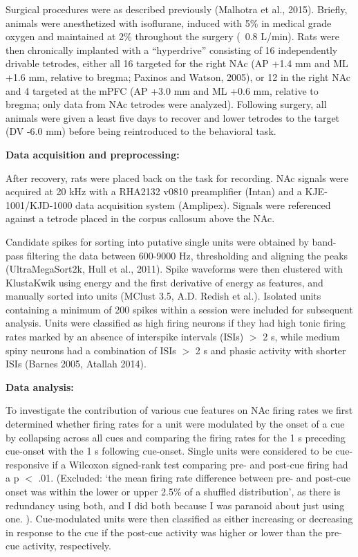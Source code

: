 \documentclass[11pt]{article}
\begin{document}
Surgical procedures were as described previously (Malhotra et al., 2015). Briefly, animals were anesthetized with isoflurane, induced with 5\% in medical grade oxygen and maintained at 2\% throughout the surgery (~0.8 L/min). Rats were then chronically implanted with a “hyperdrive” consisting of 16 independently drivable tetrodes, either all 16 targeted for the right NAc (AP +1.4 mm and ML +1.6 mm, relative to bregma; Paxinos and Watson, 2005), or 12 in the right NAc and 4 targeted at the mPFC (AP +3.0 mm and ML +0.6 mm, relative to bregma; only data from NAc tetrodes were analyzed). Following surgery, all animals were given a least five days to recover and lower tetrodes to the target (DV -6.0 mm) before being reintroduced to the behavioral task.

{\bf Data acquisition and preprocessing:}

After recovery, rats were placed back on the task for recording. NAc signals were acquired at 20 kHz with a RHA2132 v0810 preamplifier (Intan) and a KJE-1001/KJD-1000 data acquisition system (Amplipex). Signals were referenced against a tetrode placed in the corpus callosum above the NAc.

Candidate spikes for sorting into putative single units were obtained by band-pass filtering the data between 600-9000 Hz, thresholding and aligning the peaks (UltraMegaSort2k, Hull et al., 2011). Spike waveforms were then clustered with KlustaKwik using energy and the first derivative of energy as features, and manually sorted into units (MClust 3.5, A.D. Redish et al.). Isolated units containing a minimum of 200 spikes within a session were included for subsequent analysis. Units were classified as high firing neurons if they had high tonic firing rates marked by an absence of interspike intervals (ISIs) $>$ 2 s, while medium spiny neurons had a combination of ISIs $>$ 2 s and phasic activity with shorter ISIs (Barnes 2005, Atallah 2014). 

{\bf Data analysis:}

To investigate the contribution of various cue features on NAc firing rates we first determined whether firing rates for a unit were modulated by the onset of a cue by collapsing across all cues and comparing the firing rates for the 1 s preceding cue-onset with the 1 s following cue-onset. Single units were considered to be cue-responsive if a Wilcoxon signed-rank test comparing pre- and post-cue firing had a p $<$ .01. (Excluded: ‘the mean firing rate difference between pre- and post-cue onset was within the lower or upper 2.5\% of a shuffled distribution’, as there is redundancy using both, and I did both because I was paranoid about just using one. ). Cue-modulated units were then classified as either increasing or decreasing in response to the cue if the post-cue activity was higher or lower than the pre-cue activity, respectively. 
\end{document}

